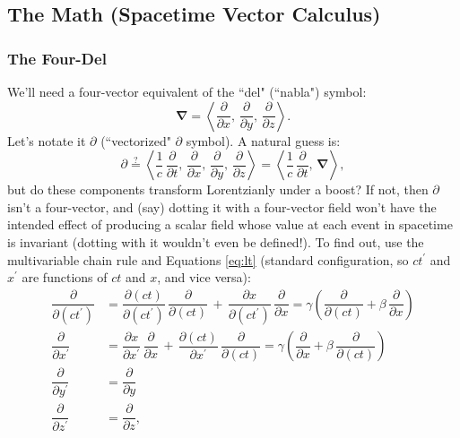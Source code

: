 \documentclass[12pt]{article}
\newcommand{\del}{\boldsymbol{\nabla}}
\begin{document}
\subsection{The Math (Spacetime Vector Calculus)}


\subsubsection{The Four-Del}

We'll need a four-vector equivalent of the ``del" (``nabla") symbol:
\begin{equation*}
\del = \left \langle \dfrac{\partial}{\partial x}, \, \dfrac{\partial}{\partial y}, \, \dfrac{\partial}{\partial z} \right \rangle .
\end{equation*}
Let's notate it $\partialup$ (``vectorized" $\partial$ symbol). A natural guess is:
\begin{equation*}
\partialup \stackrel{?}{=} \left \langle \dfrac{1}{c} \, \dfrac{\partial}{\partial t} , \, \dfrac{\partial}{\partial x}, \, \dfrac{\partial}{\partial y}, \, \dfrac{\partial}{\partial z} \right \rangle = \left \langle \dfrac{1}{c} \, \dfrac{\partial}{\partial t} , \, \del \right \rangle ,
\end{equation*}
but do these components transform Lorentzianly under a boost? If not, then $\partialup$ isn't a four-vector, and (say) dotting it with a four-vector field won't have the intended effect of producing a scalar field whose value at each event in spacetime is invariant (dotting with it wouldn't even be defined!). To find out, use the multivariable chain rule and Equations \ref{eq:lt} (standard configuration, so $ct^\prime$ and $x^\prime$ are functions of $ct$ and $x$, and vice versa):
\begin{equation*}
\begin{split}
\dfrac{\partial}{\partial (ct^\prime)} &= \dfrac{\partial (ct)}{\partial (ct^\prime)} \, \dfrac{\partial}{\partial (ct)} \, + \, \dfrac{\partial x}{\partial (ct^\prime)} \, \dfrac{\partial}{\partial x} = \gamma \left( \dfrac{\partial}{\partial (ct)} + \beta \, \dfrac{\partial}{\partial x} \right) \\[3pt]
\dfrac{\partial}{\partial x^\prime} &= \dfrac{\partial x}{\partial x^\prime} \, \dfrac{\partial}{\partial x} \, + \, \dfrac{\partial (ct)}{\partial x^\prime} \, \dfrac{\partial}{\partial (ct)}  = \gamma \left( \dfrac{\partial}{\partial x} + \beta \, \dfrac{\partial}{\partial (ct)}  \right) \\[3pt]
\dfrac{\partial}{\partial y^\prime} &= \dfrac{\partial}{\partial y} \\[3pt]
\dfrac{\partial}{\partial z^\prime} &= \dfrac{\partial}{\partial z} ,
\end{split}
\end{equation*}
\end{document}
